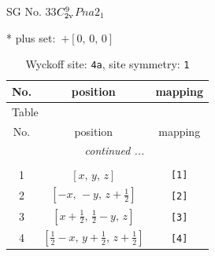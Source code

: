\documentclass[fleqn,8pt]{jsarticle}
\begin{document}
\setcounter{MaxMatrixCols}{32}

\renewcommand{\tablename}{Table~}
\renewcommand{\figurename}{Figure~}
\begin{center}
\LARGE
SG No. 33\quad$C_{\rm 2v}^{9}$\quad$Pna2_1$\quad[ orthorhombic ]
\end{center}
* plus set:\,\,\,$+\left[ 0,\, 0,\, 0 \right]$
\renewcommand{\arraystretch}{1.2}
\begin{longtable}{ccc}
\caption{Wyckoff site: {\tt 4a}, site symmetry: {\tt 1}}
 \\
 \hline \hline
No. & position & mapping \\ \hline \endfirsthead

\multicolumn{2}{l}{\tablename\ \thetable{}} \\
 \hline \hline
No. & position & mapping \\ \hline \endhead

 \hline \hline
\multicolumn{2}{r}{\footnotesize\it continued ...} \\ \endfoot

 \hline \hline
\multicolumn{2}{r}{} \\ \endlastfoot

1 & $\left[ x,\, y,\, z \right]$ & {\tt [1]} \\ \hline
2 & $\left[ - x,\, - y,\, z + \frac{1}{2} \right]$ & {\tt [2]} \\ \hline
3 & $\left[ x + \frac{1}{2},\, \frac{1}{2} - y,\, z \right]$ & {\tt [3]} \\ \hline
4 & $\left[ \frac{1}{2} - x,\, y + \frac{1}{2},\, z + \frac{1}{2} \right]$ & {\tt [4]} \\
\end{longtable}
\end{document}
